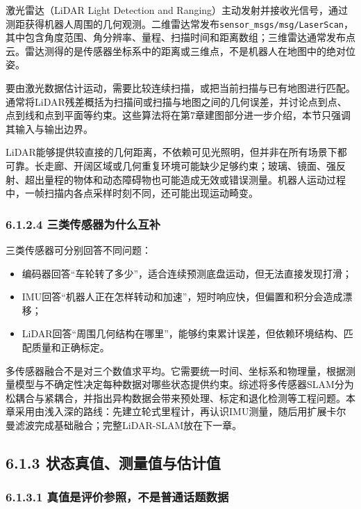 \documentclass[UTF8,zihao=-4]{ctexart}
\begin{document}
激光雷达（LiDAR Light Detection and Ranging）主动发射并接收光信号，通过测距获得机器人周围的几何观测。二维雷达常发布\texttt{sensor\_msgs/msg/LaserScan}，其中包含角度范围、角分辨率、量程、扫描时间和距离数组；三维雷达通常发布点云。雷达测得的是传感器坐标系中的距离或三维点，不是机器人在地图中的绝对位姿\cite{ros2laserscan}。

要由激光数据估计运动，需要比较连续扫描，或把当前扫描与已有地图进行匹配。通常将LiDAR残差概括为扫描间或扫描与地图之间的几何误差，并讨论点到点、点到线和点到平面等约束\cite{fan2025fusion}。这些算法将在第7章建图部分进一步介绍，本节只强调其输入与输出边界。

LiDAR能够提供较直接的几何距离，不依赖可见光照明，但并非在所有场景下都可靠。长走廊、开阔区域或几何重复环境可能缺少足够约束；玻璃、镜面、强反射、超出量程的物体和动态障碍物也可能造成无效或错误测量。机器人运动过程中，一帧扫描内各点采样时刻不同，还可能出现运动畸变。

\subsubsection*{6.1.2.4 三类传感器为什么互补}

三类传感器可分别回答不同问题：
\begin{itemize}
  \item 编码器回答“车轮转了多少”，适合连续预测底盘运动，但无法直接发现打滑；
  \item IMU回答“机器人正在怎样转动和加速”，短时响应快，但偏置和积分会造成漂移；
  \item LiDAR回答“周围几何结构在哪里”，能够约束累计误差，但依赖环境结构、匹配质量和正确标定。
\end{itemize}

多传感器融合不是对三个数值求平均。它需要统一时间、坐标系和物理量，根据测量模型与不确定性决定每种数据对哪些状态提供约束。综述将多传感器SLAM分为松耦合与紧耦合，并指出异构数据会带来预处理、标定和退化检测等工程问题\cite{fan2025fusion}。本章采用由浅入深的路线：先建立轮式里程计，再认识IMU测量，随后用扩展卡尔曼滤波完成基础融合；完整LiDAR-SLAM放在下一章。

\subsection*{6.1.3 状态真值、测量值与估计值}

\subsubsection*{6.1.3.1 真值是评价参照，不是普通话题数据}
\end{document}
